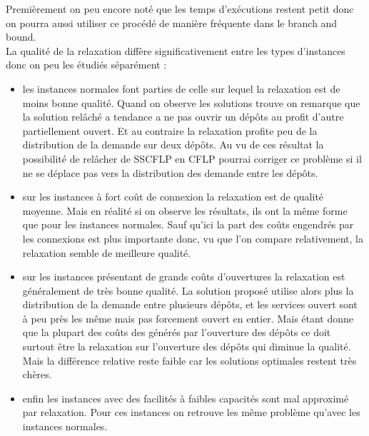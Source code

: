 \documentclass[12pt,a4paper]{article}
\begin{document}
Premièrement on peu encore noté que les temps d’exécutions restent petit donc on pourra aussi utiliser ce procédé de manière fréquente dans le branch and bound.\\

La qualité de la relaxation diffère significativement entre les types d'instances donc on peu les étudiés séparément :
\begin{itemize}
\item
les instances normales font parties de celle sur lequel la relaxation est de moins bonne qualité. Quand on observe les solutions trouve on remarque que la solution relâché a tendance a ne pas ouvrir un dépôts au profit d'autre partiellement ouvert. Et au contraire la relaxation profite peu de la distribution de la demande sur deux dépôts. Au vu de ces résultat la possibilité de relâcher de SSCFLP en CFLP pourrai corriger ce problème si il ne se déplace pas vers  la distribution des demande entre les dépôts.
\item
sur les instances à fort coût de connexion la relaxation est de qualité moyenne. Mais en réalité si on observe les résultats, ils ont la même forme que pour les instances normales. Sauf qu'ici la part des coûts engendrés par les connexions est plus importante donc, vu que l'on compare relativement, la relaxation semble de meilleure qualité.
\item
sur les instances présentant de grands coûts d'ouvertures la relaxation est généralement de très bonne qualité. La solution proposé utilise alors plus la distribution de la demande entre plusieurs dépôts, et les services ouvert sont à peu près les même mais pas forcement ouvert en entier. Mais étant donne que la plupart des coûts des générés par l’ouverture des dépôts ce doit surtout être la relaxation sur l’ouverture des dépôts qui diminue la qualité. Mais la différence relative reste faible car les solutions optimales restent très chères.
\item
enfin les instances avec des facilités à faibles capacités sont mal approximé par relaxation. Pour ces instances on retrouve les même problème qu'avec les instances normales. 
\end{itemize}
\end{document}
